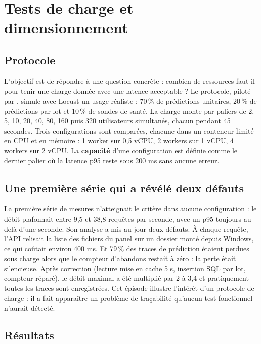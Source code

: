 \documentclass[11pt,a4paper]{article}
\newcommand{\code}[1]{\texttt{\detokenize{#1}}}
\begin{document}
\section{Tests de charge et dimensionnement}\label{sec:charge}

\subsection{Protocole}

L'objectif est de répondre à une question concrète : combien de ressources faut-il pour
tenir une charge donnée avec une latence acceptable ? Le protocole, piloté par
\code{load_tests/run.py}, simule avec Locust un usage réaliste : 70\,\% de prédictions
unitaires, 20\,\% de prédictions par lot et 10\,\% de sondes de santé. La charge monte par
paliers de 2, 5, 10, 20, 40, 80, 160 puis 320 utilisateurs simultanés, chacun pendant
45 secondes. Trois configurations sont comparées, chacune dans un conteneur limité en CPU et
en mémoire : 1 worker sur 0,5 vCPU, 2 workers sur 1 vCPU, 4 workers sur 2 vCPU. La
\textbf{capacité} d'une configuration est définie comme le dernier palier où la latence p95
reste sous 200 ms sans aucune erreur.

\subsection{Une première série qui a révélé deux défauts}

La première série de mesures n'atteignait le critère dans aucune configuration : le débit
plafonnait entre 9,5 et 38,8 requêtes par seconde, avec un p95 toujours au-delà d'une
seconde. Son analyse a mis au jour deux défauts. À chaque requête, l'API relisait la liste
des fichiers du panel sur un dossier monté depuis Windows, ce qui coûtait environ 400 ms. Et
79\,\% des traces de prédiction étaient perdues sous charge alors que le compteur d'abandons
restait à zéro : la perte était silencieuse. Après correction (lecture mise en cache 5 s,
insertion SQL par lot, compteur réparé), le débit maximal a été multiplié par 2 à 3,4 et
pratiquement toutes les traces sont enregistrées. Cet épisode illustre l'intérêt d'un
protocole de charge : il a fait apparaître un problème de traçabilité qu'aucun test
fonctionnel n'aurait détecté.

\subsection{Résultats}
\end{document}
